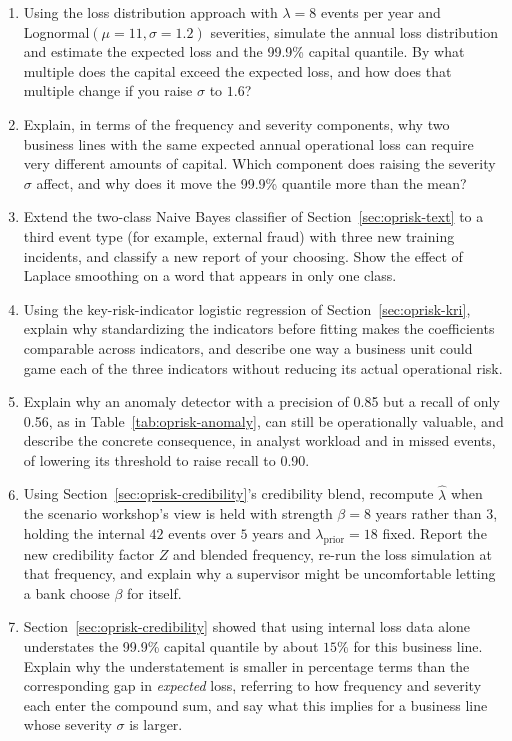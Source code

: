 \documentclass[../ai_in_finance]{subfiles}
\begin{document}
\begin{enumerate}[exercises]
\item Using the loss distribution approach with $\lambda = 8$ events per year and Lognormal$(\mu=11, \sigma=1.2)$ severities, simulate the annual loss distribution and estimate the expected loss and the 99.9\% capital quantile. By what multiple does the capital exceed the expected loss, and how does that multiple change if you raise $\sigma$ to $1.6$?
\item Explain, in terms of the frequency and severity components, why two business lines with the same expected annual operational loss can require very different amounts of capital. Which component does raising the severity $\sigma$ affect, and why does it move the 99.9\% quantile more than the mean?
\item Extend the two-class Naive Bayes classifier of Section~\ref{sec:oprisk-text} to a third event type (for example, external fraud) with three new training incidents, and classify a new report of your choosing. Show the effect of Laplace smoothing on a word that appears in only one class.
\item Using the key-risk-indicator logistic regression of Section~\ref{sec:oprisk-kri}, explain why standardizing the indicators before fitting makes the coefficients comparable across indicators, and describe one way a business unit could game each of the three indicators without reducing its actual operational risk.
\item Explain why an anomaly detector with a precision of 0.85 but a recall of only 0.56, as in Table~\ref{tab:oprisk-anomaly}, can still be operationally valuable, and describe the concrete consequence, in analyst workload and in missed events, of lowering its threshold to raise recall to 0.90.
\item Using Section~\ref{sec:oprisk-credibility}'s credibility blend, recompute $\hat\lambda$ when the scenario workshop's view is held with strength $\beta = 8$ years rather than $3$, holding the internal $42$ events over $5$ years and $\lambda_{\text{prior}}=18$ fixed. Report the new credibility factor $Z$ and blended frequency, re-run the loss simulation at that frequency, and explain why a supervisor might be uncomfortable letting a bank choose $\beta$ for itself.
\item Section~\ref{sec:oprisk-credibility} showed that using internal loss data alone understates the 99.9\% capital quantile by about $15\%$ for this business line. Explain why the understatement is smaller in percentage terms than the corresponding gap in \emph{expected} loss, referring to how frequency and severity each enter the compound sum, and say what this implies for a business line whose severity $\sigma$ is larger.

\end{enumerate}
\end{document}
